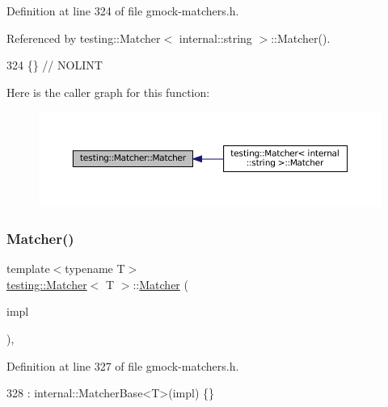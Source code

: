 Definition at line 324 of file gmock-\/matchers.\+h.



Referenced by testing\+::\+Matcher$<$ internal\+::string $>$\+::\+Matcher().


\begin{DoxyCode}
324 \{\}  \textcolor{comment}{// NOLINT}
\end{DoxyCode}
Here is the caller graph for this function\+:
\nopagebreak
\begin{figure}[H]
\begin{center}
\leavevmode
\includegraphics[width=350pt]{classtesting_1_1Matcher_a57bfc9e62d7f6acfee5ad88d1077931c_icgraph}
\end{center}
\end{figure}
\mbox{\label{classtesting_1_1Matcher_aea32eb3f86233853de91929fb2691bf3}} 
\subsubsection{\texorpdfstring{Matcher()}{Matcher()}\hspace{0.1cm}{\footnotesize\ttfamily [2/3]}}
{\footnotesize\ttfamily template$<$typename T$>$ \\
\hyperlink{classtesting_1_1Matcher}{testing\+::\+Matcher}$<$ T $>$\+::\hyperlink{classtesting_1_1Matcher}{Matcher} (\begin{DoxyParamCaption}\item[{const \hyperlink{classtesting_1_1MatcherInterface}{Matcher\+Interface}$<$ T $>$ $\ast$}]{impl }\end{DoxyParamCaption})\hspace{0.3cm}{\ttfamily [inline]}, {\ttfamily [explicit]}}



Definition at line 327 of file gmock-\/matchers.\+h.


\begin{DoxyCode}
328       : internal::MatcherBase<T>(impl) \{\}
\end{DoxyCode}
\mbox{\label{classtesting_1_1Matcher_adc75e0bd47ffc75ba8a5f760372d0493}} 
